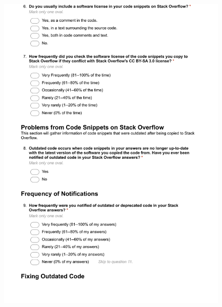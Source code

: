 \documentclass{svjour3}                     %
\begin{document}
\begin{figure}[H]
	\centering
	\includegraphics[width=0.9\linewidth]{answerer-3}
	\label{fig:answerer-3}
\end{figure}
\end{document}
